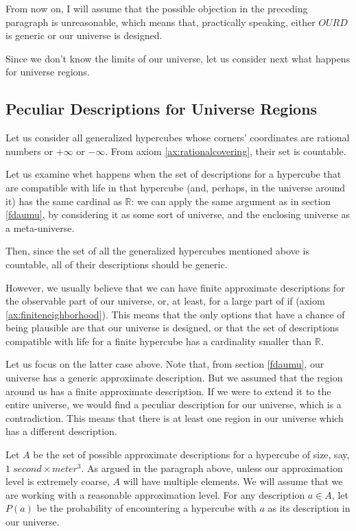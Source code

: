 \documentclass[a4paper
,draft
]{article}
\def\reale{\mathbb{R}}
\def\our_description{OURD}
\begin{document}
From now on, I will assume that the possible objection in the preceding
paragraph is unreasonable, which means that, practically speaking,
either $\our_description$ is generic or our universe is designed.

Since we don't know the limits of our universe, let us consider next
what happens for universe regions.

\subsection{Peculiar Descriptions for Universe Regions}
\label{sec:peculiarregions}

Let us consider all generalized hypercubes whose corners' coordinates are
rational numbers or $+\infty$ or $-\infty$. From axiom
\ref{ax:rationalcovering}, their set is countable.

Let us examine whet happens when the set of descriptions for a hypercube that
are compatible with life in that hypercube (and, perhaps, in the universe
around it) has the same cardinal as $\reale$: we can apply the same argument
as in section \ref{fdaumu}, by considering it as some sort of universe, and the
enclosing universe as a meta-universe.

Then, since the set of all the generalized hypercubes mentioned above is
countable, all of their descriptions should be generic.

However, we usually believe that we can have finite approximate descriptions
for the observable part of our universe, or, at least, for a large part of if
(axiom \ref{ax:finiteneighborhood}).
This means that the only options
that have a chance of being plausible are that our universe is designed, or
that the set of descriptions compatible with life for a finite hypercube
has a cardinality smaller than $\reale$.

Let us focus on the latter case above.
Note that, from section \ref{fdaumu}, our universe has
a generic approximate description.
But we assumed that the region around us has a finite approximate description.
If we were to extend it to the entire universe, we would find a peculiar
description for our universe, which is a contradiction. This means that there
is at least one region in our universe which has a different description.

Let $A$ be the set of possible approximate descriptions for
a hypercube of size, say, $1\;second \times meter^3$.
As argued in the paragraph above,
unless our approximation level is extremely coarse,
$A$ will have multiple elements.
We will assume that we are working with a reasonable approximation level.
For any description $a\in A$, let $P(a)$ be the probability of encountering
a hypercube with $a$ as its description in our universe.
\end{document}
